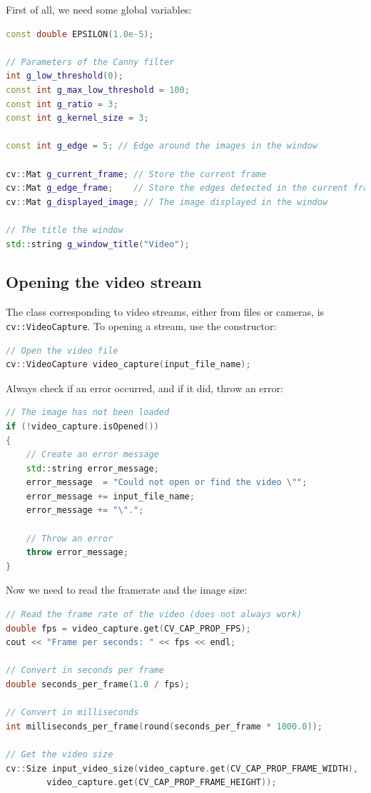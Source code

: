 \documentclass[english,a4paper,12pt,oneside]{article}
\begin{document}
First of all, we need some global variables:
\begin{lstlisting}[language=c++]
const double EPSILON(1.0e-5);

// Parameters of the Canny filter
int g_low_threshold(0);
const int g_max_low_threshold = 100;
const int g_ratio = 3;
const int g_kernel_size = 3;

const int g_edge = 5; // Edge around the images in the window

cv::Mat g_current_frame; // Store the current frame
cv::Mat g_edge_frame;    // Store the edges detected in the current frame
cv::Mat g_displayed_image; // The image displayed in the window

// The title the window
std::string g_window_title("Video");
\end{lstlisting}


\subsection{Opening the video stream}
\label{sec:param}

The class corresponding to video streams, either from files or cameras, is \verb+cv::VideoCapture+. 
To opening a stream, use the constructor:
\begin{lstlisting}[language=c++]
// Open the video file
cv::VideoCapture video_capture(input_file_name);
\end{lstlisting}
Always check if an error occurred, and if it did, throw an error:
\begin{lstlisting}[language=c++]
// The image has not been loaded
if (!video_capture.isOpened())
{
    // Create an error message
    std::string error_message;
    error_message  = "Could not open or find the video \"";
    error_message += input_file_name;
    error_message += "\".";

    // Throw an error
    throw error_message;
}
\end{lstlisting}

Now we need to read the framerate and the image size:
\begin{lstlisting}[language=c++]
// Read the frame rate of the video (does not always work)
double fps = video_capture.get(CV_CAP_PROP_FPS);  
cout << "Frame per seconds: " << fps << endl;

// Convert in seconds per frame
double seconds_per_frame(1.0 / fps);

// Convert in milliseconds
int milliseconds_per_frame(round(seconds_per_frame * 1000.0));

// Get the video size
cv::Size input_video_size(video_capture.get(CV_CAP_PROP_FRAME_WIDTH),
		video_capture.get(CV_CAP_PROP_FRAME_HEIGHT));
\end{lstlisting}
\end{document}
